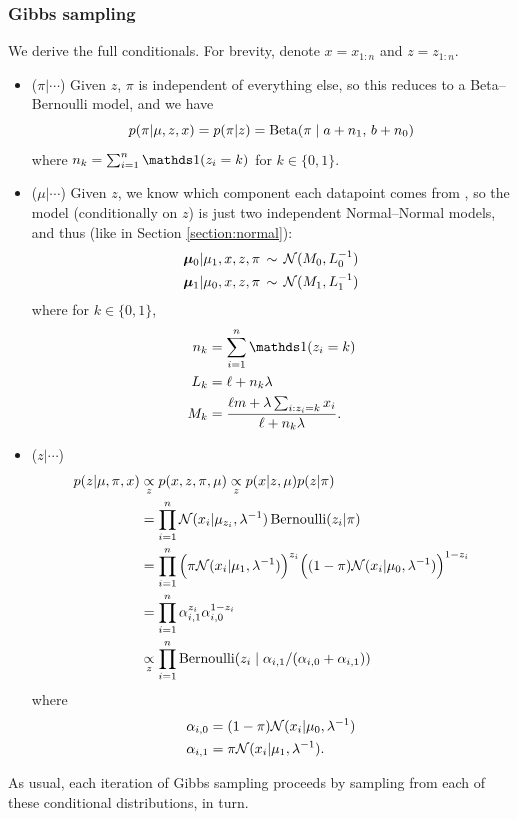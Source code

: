 \documentclass[12pt]{article}
\begin{document}
\subsubsection{Gibbs sampling}
We derive the full conditionals. For brevity, denote $x=x_{1:n}$ and $z=z_{1:n}$.
\begin{itemize}
    \item ($\pi|\cdots$) Given $z$, $\pi$ is independent of everything else, so this reduces to a Beta--Bernoulli model, and we have
        $$ p(\pi|\mu,z,x) = p(\pi|z) =\operatorname*{Beta}(\pi\mid a + n_1,\, b + n_0) $$
        where $n_k = \sum_{i=1}^n \I(z_i=k)$ for $k \in \{0, 1\}$.
    \item ($\mu|\cdots$) Given $z$, we know which component each datapoint comes from , so the model (conditionally on $z$) is just two
        independent Normal--Normal models, and thus (like in Section \ref{section:normal}):
        \begin{align*}
            \bm\mu_0|\mu_1,x,z,\pi\, \sim \,\mathcal{N}(M_0,L_0^{-1})\\
            \bm\mu_1|\mu_0,x,z,\pi\, \sim \,\mathcal{N}(M_1,L_1^{-1})
        \end{align*}
        where for $k\in\{0,1\}$,
        \begin{align*}
        n_k &= \sum_{i=1}^n \I(z_i=k)\\
        L_k &=\ell + n_k\lambda\\
        M_k &=\frac{\ell m + \lambda\sum_{i:z_i=k} x_i}{\ell + n_k\lambda}.
        \end{align*}
    \item ($z|\cdots$)
        \begin{align*}
            p(z|\mu,\pi,x)&\underset{z}{\propto}p(x,z,\pi,\mu)\underset{z}{\propto} p(x|z,\mu) p(z|\pi)\\
            & =\prod_{i = 1}^n \mathcal{N}(x_i|\mu_{z_i},\lambda^{-1})\operatorname*{Bernoulli}(z_i|\pi)\\
            & =\prod_{i = 1}^n \Big(\pi\mathcal{N}(x_i|\mu_1,\lambda^{-1})\Big)^{z_i} \Big((1-\pi)\mathcal{N}(x_i|\mu_0,\lambda^{-1})\Big)^{1-z_i}\\
            & =\prod_{i = 1}^n \alpha_{i,1}^{z_i} \alpha_{i,0}^{1-z_i}\\
            &\underset{z}{\propto}\prod_{i = 1}^n\operatorname*{Bernoulli}(z_i\mid \alpha_{i,1}/(\alpha_{i,0}+\alpha_{i,1}))
        \end{align*}
        where
        \begin{align*}
            \alpha_{i,0} & =(1-\pi)\mathcal{N}(x_i|\mu_0,\lambda^{-1})\\
            \alpha_{i,1} & =\pi\mathcal{N}(x_i|\mu_1,\lambda^{-1}).
        \end{align*}
\end{itemize}
As usual, each iteration of Gibbs sampling proceeds by sampling from each of these conditional distributions, in turn.
\end{document}
